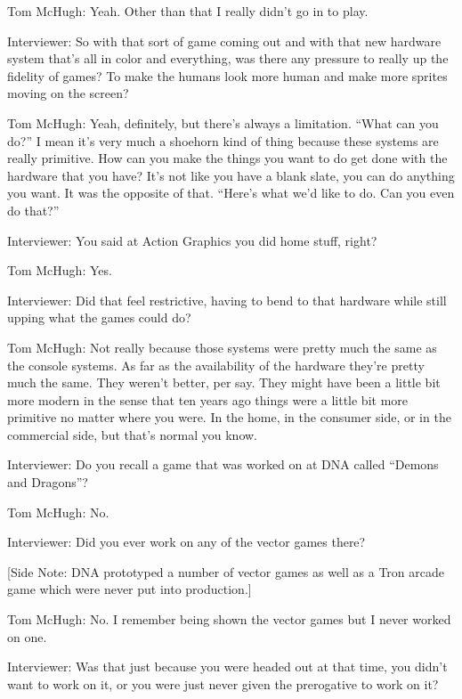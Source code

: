 \textcolor{interviewee}{Tom McHugh:} Yeah. Other than that I really didn’t go in to play.

\textcolor{interviewer}{Interviewer:} So with that sort of game coming out and with that new hardware system that’s all in color and everything, was there any pressure to really up the fidelity of games? To make the humans look more human and make more sprites moving on the screen?

\textcolor{interviewee}{Tom McHugh:} Yeah, definitely, but there’s always a limitation. “What can you do?” I mean it’s very much a shoehorn kind of thing because these systems are really primitive. How can you make the things you want to do get done with the hardware that you have? It’s not like you have a blank slate, you can do anything you want. It was the opposite of that. “Here’s what we’d like to do. Can you even do that?”

\textcolor{interviewer}{Interviewer:} You said at Action Graphics you did home stuff, right?

\textcolor{interviewee}{Tom McHugh:} Yes.

\textcolor{interviewer}{Interviewer:} Did that feel restrictive, having to bend to that hardware while still upping what the games could do?

\textcolor{interviewee}{Tom McHugh:} Not really because those systems were pretty much the same as the console systems. As far as the availability of the hardware they’re pretty much the same. They weren’t better, per say. They might have been a little bit more modern in the sense that ten years ago things were a little bit more primitive no matter where you were. In the home, in the consumer side, or in the commercial side, but that’s normal you know.

\textcolor{interviewer}{Interviewer:} Do you recall a game that was worked on at DNA called “Demons and Dragons”?

\textcolor{interviewee}{Tom McHugh:} No.

\textcolor{interviewer}{Interviewer:} Did you ever work on any of the vector games there?

[Side Note: DNA prototyped a number of vector games as well as a Tron arcade game which were never put into production.]

\textcolor{interviewee}{Tom McHugh:} No. I remember being shown the vector games but I never worked on one.

\textcolor{interviewer}{Interviewer:} Was that just because you were headed out at that time, you didn’t want to work on it, or you were just never given the prerogative to work on it?

